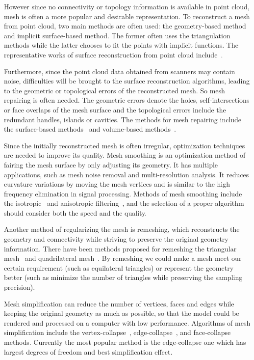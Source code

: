 However since no connectivity or topology information is available in point cloud, mesh is often a more popular and desirable representation. To reconstruct a mesh from point cloud, two main methods are often used: the geometry-based method and implicit surface-based method. The former often uses the triangulation methods while the latter chooses to fit the points with implicit functions. The representative works of surface reconstruction from point cloud include~\cite{LC87,CL96,ABK98,HDDMS92,CBCMFME01}.

Furthermore, since the point cloud data obtained from scanners may contain noise, difficulties will be brought to the surface reconstruction algorithms, leading to the geometric or topological errors of the reconstructed mesh. So mesh repairing is often needed. The geometric errors denote the holes, self-intersections or face overlaps of the mesh surface and the topological errors include the redundant handles, islands or cavities. The methods for mesh repairing include the surface-based methods~\cite{BS95,LP03,GW01} and volume-based methods~\cite{NT03,JT04,ZJH07}.

Since the initially reconstructed mesh is often irregular, optimization techniques are needed to improve its quality. Mesh smoothing is an optimization method of fairing the mesh surface by only adjusting its geometry. It has multiple applications, such as mesh noise removal and multi-resolution analysis. It reduces curvature variations by moving the mesh vertices and is similar to the high frequency elimination in signal processing. Methods of mesh smoothing include the isotropic~\cite{TG95,DMSB99,LTJW07} and anisotropic filtering~\cite{CDR00,BX03,JDD03,SRML07}, and the selection of a proper algorithm should consider both the speed and the quality.

Another method of regularizing the mesh is remeshing, which reconstructs the geometry and connectivity while striving to preserve the original geometry information. There have been methods proposed for remeshing the triangular mesh~\cite{AVDI03,SG03,AMD02} and quadrilateral mesh~\cite{ACDLD03,ML04}. By remeshing we could make a mesh meet our certain requirement (such as equilateral triangles) or represent the geometry better (such as minimize the number of triangles while preserving the sampling precision).

Mesh simplification can reduce the number of vertices, faces and edges while keeping the original geometry as much as possible, so that the model could be rendered and processed on a computer with low performance. Algorithms of mesh simplification include the vertex-collapse~\cite{SZL92,CVMT96}, edge-collapse~\cite{HDDMS93,HH96,LT98}, and face-collapse~\cite{WHST01} methods. Currently the most popular method is the edge-collapse one which has largest degrees of freedom and best simplification effect.

